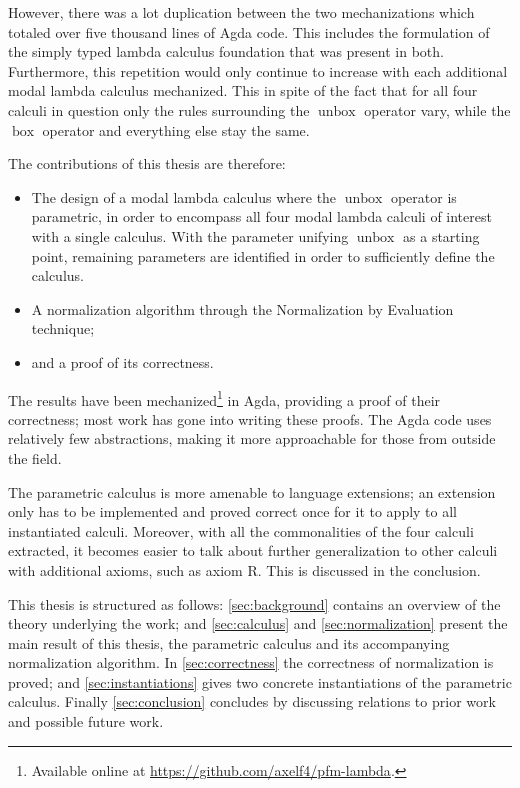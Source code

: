 \documentclass[12pt,twoside,openright]{report}
\numberwithin{equation}{chapter}
\numberwithin{figure}{chapter}
\numberwithin{table}{chapter}
\theoremstyle{definition}\newtheorem{definition}{Definition}
\begin{document}
However, there was a lot duplication between the two mechanizations
which totaled over five thousand lines of Agda code.
This includes the formulation of the simply typed lambda calculus foundation
that was present in both.
Furthermore, this repetition would only continue to increase
with each additional modal lambda calculus mechanized.
This in spite of the fact that for all four calculi in question
only the rules surrounding the $\operatorname{unbox}$ operator vary,
while the $\operatorname{box}$ operator and everything else stay the same.

The contributions of this thesis are therefore:
\begin{itemize}
\item The design of a modal lambda calculus
  where the $\operatorname{unbox}$ operator is parametric,
  in order to encompass all four modal lambda calculi of interest
  with a single calculus.
  With the parameter unifying $\operatorname{unbox}$ as a starting point,
  remaining parameters are identified in order to sufficiently define the calculus.
\item A normalization algorithm
  through the Normalization by Evaluation \cite{berger91} technique;
\item and a proof of its correctness.
\end{itemize}
The results have been mechanized\footnote{Available online at
\url{https://github.com/axelf4/pfm-lambda}.}
in Agda, providing a proof of their correctness;
most work has gone into writing these proofs.
The Agda code uses relatively few abstractions,
making it more approachable for those from outside the field.

The parametric calculus is more amenable to language extensions;
an extension only has to be implemented and proved correct once
for it to apply to all instantiated calculi.
Moreover, with all the commonalities of the four calculi extracted,
it becomes easier to talk about further generalization
to other calculi with additional axioms, such as axiom R.
This is discussed in the conclusion.

This thesis is structured as follows:
\autoref{sec:background} contains an overview of the theory underlying the work;
and \autoref{sec:calculus} and \autoref{sec:normalization}
present the main result of this thesis,
the parametric calculus and its accompanying normalization algorithm.
In \autoref{sec:correctness} the correctness of normalization is proved;
and \autoref{sec:instantiations} gives two concrete instantiations
of the parametric calculus.
Finally \autoref{sec:conclusion} concludes by discussing
relations to prior work and possible future work.
\end{document}
